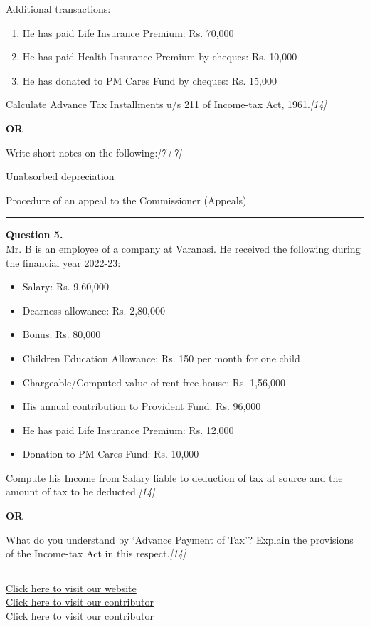 \documentclass[11pt,a4paper]{article}
\newcommand{\pts}[1]{\hfill   \textit{[#1]}}
\begin{document}
Additional transactions:

\begin{enumerate}[label=(\alph*)]
  \item He has paid Life Insurance Premium: Rs. 70,000
  \item He has paid Health Insurance Premium by cheques: Rs. 10,000
  \item He has donated to PM Cares Fund by cheques: Rs. 15,000
\end{enumerate}
Calculate Advance Tax Installments u/s 211 of Income-tax Act, 1961.\pts{14}

\centerline{   \textbf{OR}}

Write short notes on the following:\pts{7+7}

\begin{parts}
  \item Unabsorbed depreciation
  \item Procedure of an appeal to the Commissioner (Appeals)
\end{parts}

\medskip\rule{\linewidth}{0.2pt}




\noindent   \textbf{Question 5.} \\
Mr. B is an employee of a company at Varanasi. He received the following during the financial year 2022-23:

\begin{itemize}
  \item Salary: Rs. 9,60,000
  \item Dearness allowance: Rs. 2,80,000
  \item Bonus: Rs. 80,000
  \item Children Education Allowance: Rs. 150 per month for one child
  \item Chargeable/Computed value of rent-free house: Rs. 1,56,000
  \item His annual contribution to Provident Fund: Rs. 96,000
  \item He has paid Life Insurance Premium: Rs. 12,000
  \item Donation to PM Cares Fund: Rs. 10,000
\end{itemize}
Compute his Income from Salary liable to deduction of tax at source and the amount of tax to be deducted.\pts{14}

\centerline{   \textbf{OR}}

What do you understand by `Advance Payment of Tax'? Explain the provisions of the Income-tax Act in this respect.\pts{14}

\vfill
\rule{\linewidth}{0.4pt}

\begin{center}\small
  \href{https://bhu-exam.vercel.app/}{Click here to visit our website}\\[4pt]
  \href{https://me-aryan.vercel.app/}{Click here to visit our contributor}\\[4pt]
  \href{https://quashan-me.vercel.app/}{Click here to visit our contributor}
\end{center}
\end{document}
